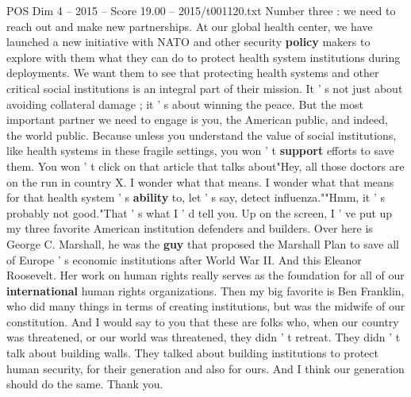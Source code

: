 \begin{textsample}{POS Dim 4 – 2015 – Score 19.00 – 2015/t001120.txt}
Number three : we need to reach out and make new partnerships.
At our global health center, we have launched a new initiative with NATO and other security \textbf{policy} makers to explore with them what they can do to protect health system institutions during deployments.
We want them to see that protecting health systems and other critical social institutions is an integral part of their mission.
It ' s not just about avoiding collateral damage ; it ' s about winning the peace.
But the most important partner we need to engage is you, the American public, and indeed, the world public.
Because unless you understand the value of social institutions, like health systems in these fragile settings, you won ' t \textbf{support} efforts to save them.
You won ' t click on that article that talks about"Hey, all those doctors are on the run in country X.
I wonder what that means.
I wonder what that means for that health system ' s \textbf{ability} to, let ' s say, detect influenza.""Hmm, it ' s probably not good."That ' s what I ' d tell you.
Up on the screen, I ' ve put up my three favorite American institution defenders and builders.
Over here is George C.
Marshall, he was the \textbf{guy} that proposed the Marshall Plan to save all of Europe ' s economic institutions after World War II.
And this Eleanor Roosevelt.
Her work on human rights really serves as the foundation for all of our \textbf{international} human rights organizations.
Then my big favorite is Ben Franklin, who did many things in terms of creating institutions, but was the midwife of our constitution.
And I would say to you that these are folks who, when our country was threatened, or our world was threatened, they didn ' t retreat.
They didn ' t talk about building walls.
They talked about building institutions to protect human security, for their generation and also for ours.
And I think our generation should do the same.
Thank you.

\end{textsample}
